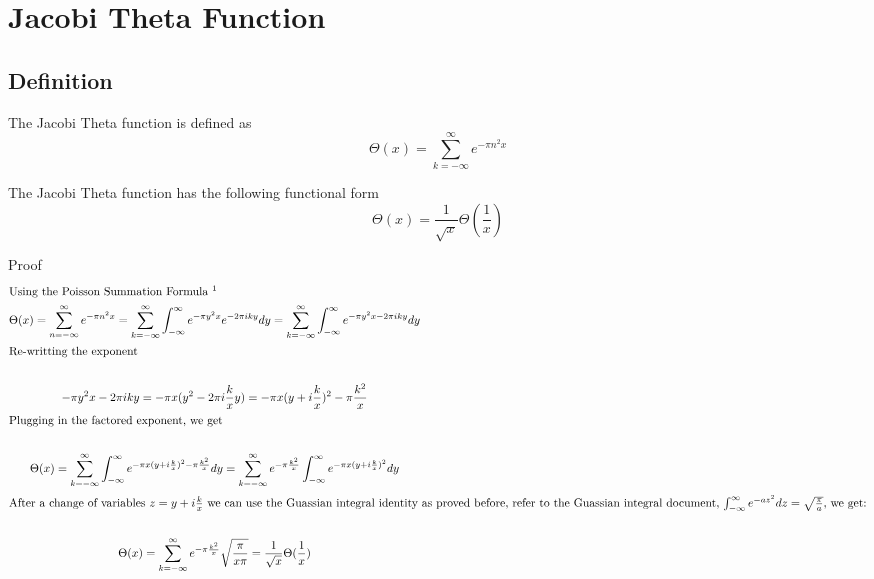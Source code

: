 \documentclass[a4paper]{article}
\begin{document}
\section{Jacobi Theta Function}

\subsection{Definition}
\begin{definition}\label{Jacobi Theta def}
The Jacobi Theta function is defined as 
$$
\Theta(x) = \sum_{k=-\infty}^{\infty} e^{- \pi n^2 x} 
$$
\end{definition}

\begin{theorem}
The Jacobi Theta function has the following functional form
\begin{equation} \label{Jacobi functional form}
\Theta(x) = \frac{1}{\sqrt{x}} \Theta(\frac{1}{x})
\end{equation}

Proof
\begin{gather*}
\intertext{Using the Poisson Summation Formula \footnotemark}
\Theta(x) = \sum_{n=-\infty}^{\infty} e^{- \pi n^2 x} = \sum_{k=-\infty}^{\infty} 
\int_{-\infty}^{\infty}
e^{- \pi y^2 x} e^{-2 \pi i k y} dy 
=
\sum_{k=-\infty}^{\infty} 
\int_{-\infty}^{\infty}
e^{- \pi y^2 x -2 \pi i k y} dy 
\\
\intertext{Re-writting the exponent}
\\ 
- \pi y^2 x -2 \pi i k y 
= - \pi x (y^2 -2 \pi i \frac{k}{x} y)
= - \pi x (y + i \frac{k}{x})^2 - \pi \frac{k^2}{x}
\\
\intertext{Plugging in the factored exponent, we get}
\\
\Theta(x) 
=
\sum_{k=-\infty}^{\infty} 
\int_{-\infty}^{\infty}
e^{- \pi x (y + i \frac{k}{x})^2 - \pi \frac{k^2}{x}} dy 
=
\sum_{k=-\infty}^{\infty}
e^{- \pi \frac{k^2}{x}} 
\int_{-\infty}^{\infty}
e^{- \pi x (y + i \frac{k}{x})^2} dy
\\
\intertext{After a change of variables $z = y + i \frac{k}{x}$ we can use the Guassian integral identity as proved before, refer to the Guassian integral document, $\int_{-\infty}^{\infty}
e^{- a z^2 } dz = \sqrt{\frac{\pi}{a}} $, we get:}
\\ 
\Theta(x) 
=
\sum_{k=-\infty}^{\infty}
e^{- \pi \frac{k^2}{x}} 
\sqrt{\frac{\pi}{x \pi}}
= \frac{1}{\sqrt{x}} \Theta(\frac{1}{x}) 
\end{gather*}
\end{theorem}
\end{document}
